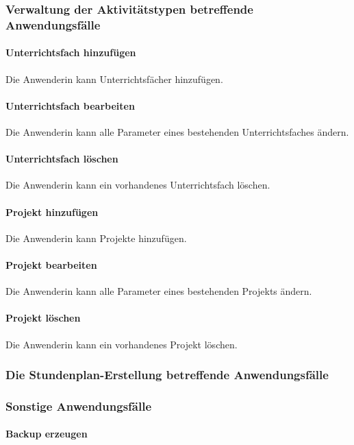 \documentclass[fontsize=12pt,paper=a4,twoside]{scrartcl}
\begin{document}
\subsubsection{Verwaltung der Aktivitätstypen betreffende Anwendungsfälle}

\paragraph{Unterrichtsfach hinzufügen}
Die Anwenderin kann Unterrichtsfächer hinzufügen.

\paragraph{Unterrichtsfach bearbeiten}
Die Anwenderin kann alle Parameter eines bestehenden Unterrichtsfaches ändern.

\paragraph{Unterrichtsfach löschen}
Die Anwenderin kann ein vorhandenes Unterrichtsfach löschen.

\paragraph{Projekt hinzufügen}
Die Anwenderin kann Projekte hinzufügen.

\paragraph{Projekt bearbeiten}
Die Anwenderin kann alle Parameter eines bestehenden Projekts ändern.

\paragraph{Projekt löschen}
Die Anwenderin kann ein vorhandenes Projekt löschen.

\subsubsection{Die Stundenplan-Erstellung betreffende Anwendungsfälle}

\subsubsection{Sonstige Anwendungsfälle}

\paragraph{Backup erzeugen}
\end{document}
